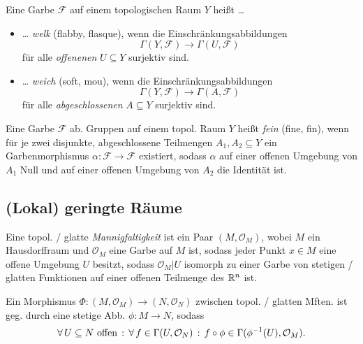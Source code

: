 \documentclass{cheat-sheet}
\newcommand{\Fais}{\mathcal{F}} %
\renewcommand{\O}{\mathcal{O}} %
\begin{document}
\begin{samepage}

\begin{defn}
   Eine Garbe $\Fais$ auf einem topologischen Raum $Y$ heißt \ldots{}
  \begin{itemize}
    \item \ldots{} \emph{welk} (flabby, flasque), wenn die Einschränkungsabbildungen
    \[ \Gamma(Y, \Fais) \to \Gamma(U, \Fais) \]
    für alle {\em offenenen} $U \subseteq Y$ surjektiv sind.
    \item \ldots{} \emph{weich} (soft, mou), wenn die Einschränkungsabbildungen
    \[ \Gamma(Y, \Fais) \to \Gamma(A, \Fais) \]
    für alle {\em abgeschlossenen} $A \subseteq Y$ surjektiv sind.
  \end{itemize}
\end{defn}

\begin{defn}
   Eine Garbe $\Fais$ ab. Gruppen auf einem topol. Raum $Y$ heißt \emph{fein} (fine, fin), wenn für je zwei disjunkte, abgeschlossene Teilmengen $A_1, A_2 \subseteq Y$ ein Garbenmorphismus $\alpha : \Fais \to \Fais$ existiert, sodass $\alpha$ auf einer offenen Umgebung von $A_1$ Null und auf einer offenen Umgebung von $A_2$ die Identität ist.
\end{defn}

\subsection{(Lokal) geringte Räume}

\end{samepage}


\begin{defn}
  Eine topol. / glatte \emph{Mannigfaltigkeit} ist ein Paar $(M, \O_M)$, wobei $M$ ein Hausdorffraum und $\O_M$ eine Garbe auf $M$ ist, sodass jeder Punkt $x \in M$ eine offene Umgebung $U$ besitzt, sodass $\O_M|U$ isomorph zu einer Garbe von stetigen / glatten Funktionen auf einer offenen Teilmenge des $\mathbb{R}^n$ ist.
\end{defn}

\begin{defn}
  Ein Morphismus $\Phi : (M, \O_M) \to (N, \O_N)$ zwischen topol. / glatten Mften. ist geg. durch eine stetige Abb. $\phi : M \to N$, sodass
  \[
    \fa{U \subseteq N \text{ offen}} \fa{f \in \Gamma(U, \O_N)} f \circ \phi \in \Gamma(\phi^{-1}(U), \O_M).
  \]
\end{defn}
\end{document}

